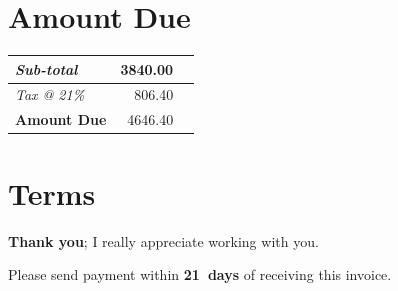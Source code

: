 \documentclass[a4paper,table]{article}
\begin{document}
\section*{Amount Due}
\label{sec:orgheadline2}

\hfill\colorbox{prlp-gray96}{\begin{minipage}{7.5cm}
\begin{center}
\begin{tabu}{Xrl}
\emph{Sub-total} & 3840.00 & \texteuro{}\\
\hline
\emph{Tax @ 21\%} & 806.40 & \texteuro{}\\
\hline
\textbf{Amount Due} & 4646.40 & \textbf{\texteuro{}}\\
\end{tabu}
\end{center}

\end{minipage}}

\section*{Terms}
\label{sec:orgheadline3}

\textbf{Thank you}; I really appreciate working with you.

Please send payment within \textbf{21~days} of receiving this invoice.

\vfill
\end{document}
